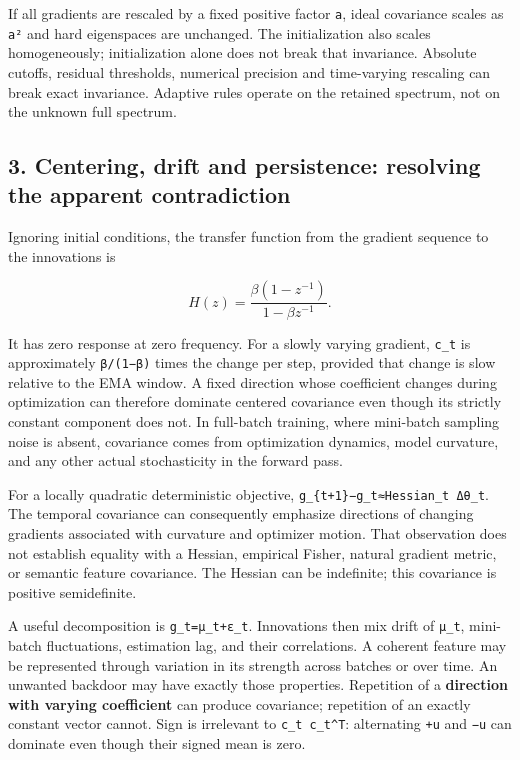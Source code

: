 \documentclass[
  british,
  10pt,
  a4paper,
]{article}
\begin{document}
If all gradients are rescaled by a fixed positive factor \texttt{a},
ideal covariance scales as \texttt{a²} and hard eigenspaces are
unchanged. The initialization also scales homogeneously; initialization
alone does not break that invariance.\allowbreak{} Absolute cutoffs,
residual thresholds,\allowbreak{} numerical precision and
time-\allowbreak{}varying rescaling can break exact
invariance.\allowbreak{} Adaptive rules operate on the retained
spectrum, not on the unknown full spectrum.

\subsection{3. Centering, drift and persistence: resolving the apparent
contradiction}\label{mathematical-audit--centering-drift-and-persistence-resolving-the-apparent-contradiction}

Ignoring initial conditions,\allowbreak{} the transfer function from the
gradient sequence to the innovations is

\[
H(z)=\frac{\beta(1-z^{-1})}{1-\beta z^{-1}}.
\]

It has zero response at zero frequency. For a slowly varying gradient,
\texttt{c\_t} is approximately \texttt{β/(1−β)} times the change per
step, provided that change is slow relative to the EMA window. A fixed
direction whose coefficient changes during optimization can therefore
dominate centered covariance even though its strictly constant component
does not. In full-batch training, where mini-batch sampling noise is
absent, covariance comes from optimization dynamics, model curvature,
and any other actual stochasticity in the forward pass.

For a locally quadratic deterministic objective,
\texttt{g\_\allowbreak{}\{\allowbreak{}t+1\}\allowbreak{}−g\_\allowbreak{}t≈Hessian\_\allowbreak{}t \allowbreak{}Δθ\_\allowbreak{}t}.
The temporal covariance can consequently emphasize directions of
changing gradients associated with curvature and optimizer motion. That
observation does not establish equality with a Hessian, empirical
Fisher, natural gradient metric, or semantic feature
covariance.\allowbreak{} The Hessian can be indefinite; this covariance
is positive semidefinite\allowbreak{}.\allowbreak{}

A useful decomposition is
\texttt{g\_\allowbreak{}t=\allowbreak{}μ\_\allowbreak{}t+ε\_\allowbreak{}t}.
Innovations then mix drift of \texttt{μ\_t}, mini-batch
fluctuations\allowbreak{},\allowbreak{} estimation lag, and their
correlations\allowbreak{}.\allowbreak{} A coherent feature may be
represented through variation in its strength across batches or over
time. An unwanted backdoor may have exactly those
properties.\allowbreak{} Repetition of a \textbf{direction with varying
coefficient} can produce covariance; repetition of an exactly constant
vector cannot. Sign is irrelevant to \texttt{c\_t\ c\_t\^{}T}:
alternating \texttt{+u} and \texttt{−u} can dominate even though their
signed mean is zero.
\end{document}
